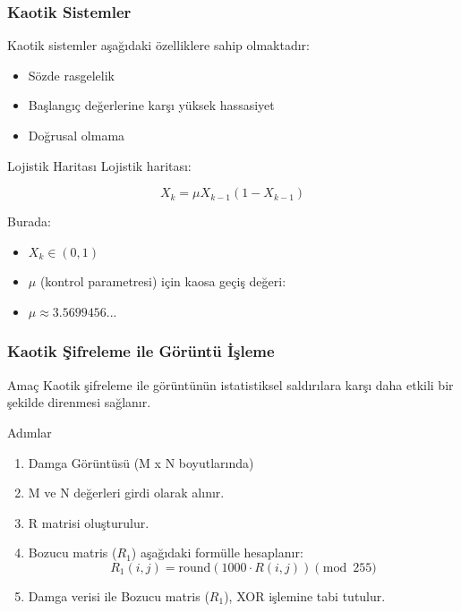 \documentclass[aspectratio=169,xcolor={dvipsnames}]{beamer}
\begin{document}
\begin{frame}
  \frametitle{Kaotik Sistemler}
  
  Kaotik sistemler aşağıdaki özelliklere sahip olmaktadır:
  \begin{itemize}
    \item Sözde rasgelelik
    \item Başlangıç değerlerine karşı yüksek hassasiyet
    \item Doğrusal olmama
  \end{itemize}
  
  \vfill %
  
  \begin{block}{Lojistik Haritası}
    Lojistik haritası:
    
   
    $$ X_{k} = \mu X_{k-1}(1 - X_{k-1}) $$
    
    Burada:
    \begin{itemize}
        \item $X_k \in (0,1)$
        \item $\mu$ (kontrol parametresi) için kaosa geçiş değeri:
        \item $\mu \approx 3.5699456...$
    \end{itemize}
    
    
  \end{block}
\end{frame}

\begin{frame}
  \frametitle{Kaotik Şifreleme ile Görüntü İşleme}
  
  \begin{block}{Amaç}
    Kaotik şifreleme ile görüntünün istatistiksel saldırılara karşı daha etkili bir şekilde direnmesi sağlanır.
  \end{block}
  
  \vfill
  
  \begin{block}{Adımlar}
    \begin{enumerate}
      \item Damga Görüntüsü (M x N boyutlarında)
      \item M ve N değerleri girdi olarak alınır.
      \item R matrisi oluşturulur.
      \item Bozucu matris ($R_1$) aşağıdaki formülle hesaplanır:
      $$ R_1(i,j) = \text{round}(1000 \cdot R(i,j)) \pmod{255} $$
      
      \item Damga verisi ile Bozucu matris ($R_1$), XOR işlemine tabi tutulur.
    \end{enumerate}
  \end{block}
  
\end{frame}
\end{document}

